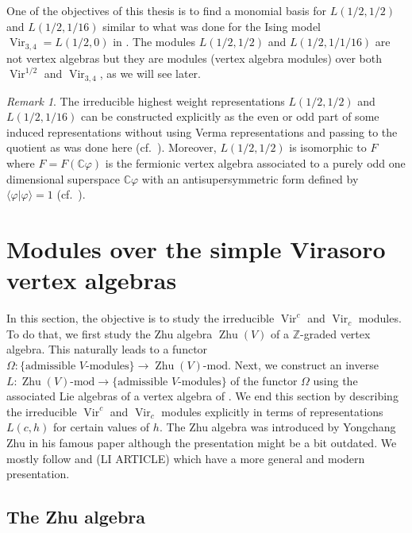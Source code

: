 \documentclass[a4paper, 12pt, reqno]{amsart}
\theoremstyle{remark}
\newtheorem{remark}[theorem]{Remark}
\numberwithin{equation}{subsection}
\DeclareMathOperator{\Vir}{Vir}
\DeclareMathOperator{\one}{\overline{1}}
\DeclareMathOperator{\Zhu}{Zhu}
\begin{document}
One of the objectives of this thesis is to find a monomial basis for $L(1/2, 1/2)$ and $L(1/2, 1/16)$ similar to what was done for the Ising model $\Vir_{3, 4} = L(1/2, 0)$ in \cite{andrews_singular_2022}.
The modules $L(1/2, 1/2)$ and $L(1/2, 1/1/16)$ are not vertex algebras but they are modules (vertex algebra modules) over both $\Vir^{1/2}$ and $\Vir_{3, 4}$, as we will see later.

\begin{remark}
  \label{rmk:27}
  The irreducible highest weight representations $L(1/2, 1/2)$ and $L(1/2, 1/16)$ can be constructed explicitly as the even or odd part of some induced representations without using Verma representations and passing to the quotient as was done here (cf.\ \cite[\S3]{kac_bombay_2013}).
  Moreover, $L(1/2, 1/2)$ is isomorphic to $F_{\one}$ where $F = F(\mathbb{C}\varphi)$ is the fermionic vertex algebra associated to a purely odd one dimensional superspace $\mathbb{C}\varphi$ with an antisupersymmetric form defined by $\langle \varphi| \varphi\rangle = 1$ (cf.\ ).
\end{remark}

\section{Modules over the simple Virasoro vertex algebras}
\label{sec:modules-over-simple}

In this section, the objective is to study the irreducible $\Vir^c$ and $\Vir_c$ modules.
To do that, we first study the Zhu algebra $\Zhu(V)$ of a $\mathbb{Z}$-graded vertex algebra.
This naturally leads to a functor $\Omega: \{\text{admissible $V$-modules}\} \to \Zhu(V)\text{-mod}$.
Next, we construct an inverse $L: \Zhu(V)\text{-mod} \to \{\text{admissible $V$-modules}\}$ of the functor $\Omega$ using the associated Lie algebras of a vertex algebra of .
We end this section by describing the irreducible $\Vir^c$ and $\Vir_c$ modules explicitly in terms of representations $L(c, h)$ for certain values of $h$.
The Zhu algebra was introduced by Yongchang Zhu in his famous paper \cite{zhu_modular_1996} although the presentation might be a bit outdated.
We mostly follow \cite{de_sole_finite_2006} and (LI ARTICLE) which have a more general and modern presentation.

\subsection{The Zhu algebra}
\label{sec:zhu-algebra-1}
\end{document}
